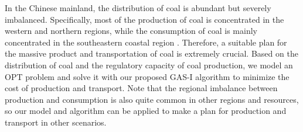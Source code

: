 \documentclass[review,hidelinks,onefignum,onetabnum]{siamart220329}
\begin{document}
In the Chinese mainland, the distribution of coal is abundant but severely imbalanced. Specifically, most of the production of coal is concentrated in the western and northern regions, while the consumption of coal is mainly concentrated in the southeastern coastal region \cite{suping2015china,mao1999china}. Therefore, a suitable plan for the massive product and transportation of coal is extremely crucial. 
Based on the distribution of coal and the regulatory capacity of coal production, we model an OPT problem and solve it with our proposed GAS-I algorithm to minimize the cost of production and transport. 
Note that the regional imbalance between production and consumption is also quite common in other regions and resources, so our model and algorithm can be applied to make a plan for production and transport in other scenarios. 
\end{document}
